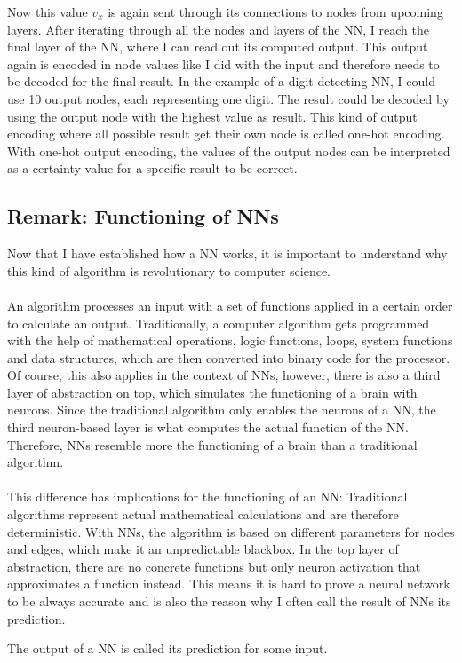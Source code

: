 \documentclass[11pt]{report}
\newcommand{\mydeflabel}{}
\newenvironment{mydef}[1]
{\renewcommand\mydeflabel{#1}\begin{mydefinner}}
{\end{mydefinner}}
\begin{document}
    Now this value $v_x$ is again sent through its connections to nodes from upcoming layers.
    After iterating through all the nodes and layers of the NN, I reach the final layer of the NN, where I can read out its computed output.
    This output again is encoded in node values like I did with the input and therefore needs to be decoded for the final result.
    In the example of a digit detecting NN, I could use 10 output nodes, each representing one digit.
    The result could be decoded by using the output node with the highest value as result.
    This kind of output encoding where all possible result get their own node is called one-hot encoding.
    With one-hot output encoding, the values of the output nodes can be interpreted as a certainty value for a specific result to be correct.

    \subsection{Remark: Functioning of NNs}\label{subsec:remark-about-the-funtioning-of-nns}
    Now that I have established how a NN works, it is important to understand why this kind of algorithm is revolutionary to computer science.
    \\ \\
    An algorithm processes an input with a set of functions applied in a certain order to calculate an output.
    Traditionally, a computer algorithm gets programmed with the help of mathematical operations, logic functions, loops, system functions and data structures, which are then converted into binary code for the processor.
    Of course, this also applies in the context of NNs, however, there is also a third layer of abstraction on top, which simulates the functioning of a brain with neurons.
    Since the traditional algorithm only enables the neurons of a NN, the third neuron-based layer is what computes the actual function of the NN\@.
    Therefore, NNs resemble more the functioning of a brain than a traditional algorithm.
    \\ \\
    This difference has implications for the functioning of an NN:
    Traditional algorithms represent actual mathematical calculations and are therefore deterministic.
    With NNs, the algorithm is based on different parameters for nodes and edges, which make it an unpredictable blackbox.
    In the top layer of abstraction, there are no concrete functions but only neuron activation that approximates a function instead.
    This means it is hard to prove a neural network to be always accurate and is also the reason why I often call the result of NNs its prediction.
    \begin{mydef}{NN Prediction}
        The output of a NN is called its prediction for some input.
    \end{mydef}
\end{document}
